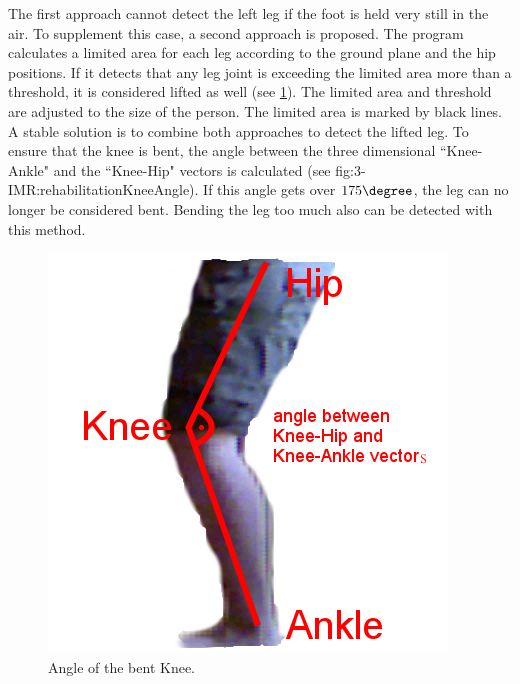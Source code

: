 The first approach cannot detect the left leg if the foot is held very still in the air. To supplement this case, a second approach is proposed. The program calculates a limited area for each leg according to the ground plane and the hip positions. If it detects that any leg joint is exceeding the limited area more than a threshold, it is considered lifted as well (see \figurename{\ref{fig:3-IMR:rehabilitationKneeAngle}}). The limited area and threshold are adjusted to the size of the person. 
The limited area is marked by black lines. 
A stable solution is to combine both approaches to detect the lifted leg.
To ensure that the knee is bent, the angle between the three dimensional ``Knee-Ankle" and the ``Knee-Hip" vectors is calculated (see \figurename{fig:3-IMR:rehabilitationKneeAngle}). If this angle gets over $175\degree$, the leg can no longer be considered bent. Bending the leg too much also can be detected with this method.
\begin{figure}
	\centering
	\includegraphics[width=0.7\linewidth]{figures/3-IMR/rehabilitationKneeAngle}
	\caption{Angle of the bent Knee.}
	\label{fig:3-IMR:rehabilitationKneeAngle}
\end{figure}

